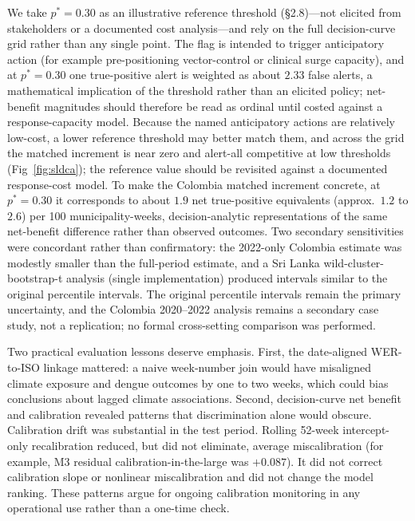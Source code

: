 \documentclass[11pt,a4paper]{article}
\begin{document}
We take $p^*=0.30$ as an illustrative reference threshold (\S2.8)---not elicited from stakeholders or a documented cost analysis---and rely on the full decision-curve grid rather than any single point. The flag is intended to trigger anticipatory action (for example pre-positioning vector-control or clinical surge capacity), and at $p^*=0.30$ one true-positive alert is weighted as about $2.33$ false alerts, a mathematical implication of the threshold rather than an elicited policy; net-benefit magnitudes should therefore be read as ordinal until costed against a response-capacity model. Because the named anticipatory actions are relatively low-cost, a lower reference threshold may better match them, and across the grid the matched increment is near zero and alert-all competitive at low thresholds (Fig~\ref{fig:sldca}); the reference value should be revisited against a documented response-cost model. To make the Colombia matched increment concrete, at $p^*=0.30$ it corresponds to about $1.9$ net true-positive equivalents (approx.\ $1.2$ to $2.6$) per 100 municipality-weeks, decision-analytic representations of the same net-benefit difference rather than observed outcomes. Two secondary sensitivities were concordant rather than confirmatory: the 2022-only Colombia estimate was modestly smaller than the full-period estimate, and a Sri Lanka wild-cluster-bootstrap-t analysis (single implementation) produced intervals similar to the original percentile intervals. The original percentile intervals remain the primary uncertainty, and the Colombia 2020--2022 analysis remains a secondary case study, not a replication; no formal cross-setting comparison was performed.

Two practical evaluation lessons deserve emphasis. First, the date-aligned WER-to-ISO linkage mattered: a naive week-number join would have misaligned climate exposure and dengue outcomes by one to two weeks, which could bias conclusions about lagged climate associations. Second, decision-curve net benefit and calibration revealed patterns that discrimination alone would obscure. Calibration drift was substantial in the test period. Rolling 52-week intercept-only recalibration reduced, but did not eliminate, average miscalibration (for example, M3 residual calibration-in-the-large was $+0.087$). It did not correct calibration slope or nonlinear miscalibration and did not change the model ranking. These patterns argue for ongoing calibration monitoring in any operational use rather than a one-time check.
\end{document}
